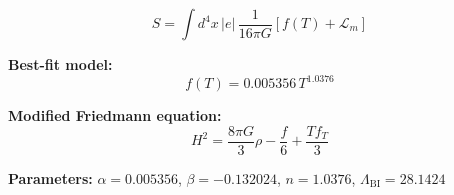 
\begin{equation}
  S = \int d^4x \, |e| \, \frac{1}{16\pi G} \left[ f(T) + \mathcal{L}_m \right]
\end{equation}

\textbf{Best-fit model:}
\begin{equation}
  f(T) = 0.005356 \, T^{1.0376}
\end{equation}

\textbf{Modified Friedmann equation:}
\begin{equation}
  H^2 = \frac{8\pi G}{3} \rho - \frac{f}{6} + \frac{T f_T}{3}
\end{equation}

\textbf{Parameters:}
$\alpha = 0.005356$, \quad
$\beta = -0.132024$, \quad
$n = 1.0376$, \quad
$\Lambda_{\text{BI}} = 28.1424$